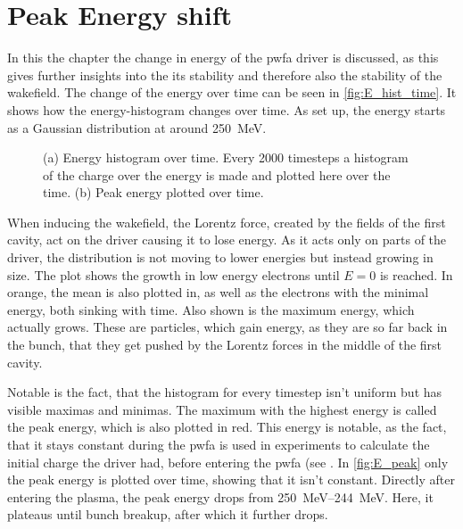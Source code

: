 \documentclass[bachelor_thesis]{subfiles}
\begin{document}

\section{Peak Energy shift}
In this the chapter the change in energy of the \gls{pwfa} driver is discussed, as this gives further insights into the its stability and therefore also the stability of the wakefield.
The change of the energy over time can be seen in \autoref{fig:E_hist_time}. It shows how the energy-histogram changes over time. As set up, the energy starts as a Gaussian distribution at around \qty{250}{\MeV}.
\begin{figure}
	\centering
	\begin{subfigure}{0.5\textwidth}
	\centering
	\missingfigure{}
	\caption{} \label{fig:E_hist_time}
	\end{subfigure}
	\hfill
	\begin{subfigure}{0.5\textwidth}
	\centering
	\missingfigure{}
	\caption{} \label{fig:E_peak}
	\end{subfigure}
	\caption{(a) Energy histogram over time. Every 2000 timesteps a histogram of the charge over the energy is made and plotted here over the time.
	(b) Peak energy plotted over time.}
	\label{fig:Energy}
\end{figure}
When inducing the wakefield, the Lorentz force, created by the fields of the first cavity, act on the driver causing it to lose energy. As it acts only on parts of the driver, the distribution is not moving to lower energies but instead growing in size.
The plot shows the growth in low energy electrons until $E=0$ is reached. In orange, the mean is also plotted in,  as well as the electrons with the minimal energy, both sinking with time. Also shown is the maximum energy, which actually grows.
These are particles, which gain energy, as they are so far back in the bunch, that they get pushed by the Lorentz forces in the middle of the first cavity.

Notable is the fact, that the histogram for every timestep isn't uniform but has visible maximas and minimas. The maximum with the highest energy is called the peak energy, which is also plotted in red.
This energy is notable, as the fact, that it stays constant during the \gls{pwfa} is used in experiments to calculate the initial charge the driver had, before entering the \gls{pwfa} (see \cite{Schoebel2022}.
In \autoref{fig:E_peak} only the peak energy is plotted over time, showing that it isn't constant. Directly after entering the plasma, the peak energy drops from \qtyrange{250}{244}{\MeV}.
Here, it plateaus until bunch breakup, after which it further drops.
\end{document}
